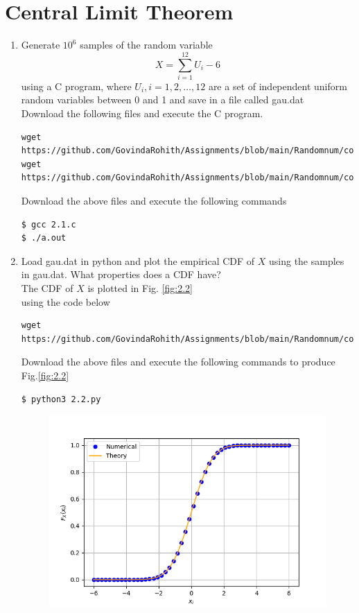\documentclass[journal,12pt,twocolumn]{IEEEtran}
\renewcommand\thesection{\arabic{section}}
\begin{document}
\section{Central Limit Theorem}
%
\begin{enumerate}[label=\thesection.\arabic*
,ref=\thesection.\theenumi]

%
\item
Generate $10^6$ samples of the random variable
%
\begin{equation}
X = \sum_{i=1}^{12}U_i -6
\end{equation}
%
using a C program, where $U_i, i = 1,2,\dots, 12$ are  a set of independent uniform random variables between 0 and 1 and save in a file called gau.dat\\
\solution Download the following files and execute the  C program.
\begin{lstlisting}
wget https://github.com/GovindaRohith/Assignments/blob/main/Randomnum/codes/2.1.c
wget https://github.com/GovindaRohith/Assignments/blob/main/Randomnum/codes/source.h
\end{lstlisting}
Download the above files and execute the following commands
\begin{lstlisting}
$ gcc 2.1.c
$ ./a.out
\end{lstlisting}
\item
Load gau.dat in python and plot the empirical CDF of $X$ using the samples in gau.dat. What properties does a CDF have?\\
\solution The CDF of $X$ is plotted in Fig. \ref{fig:2.2}\\
using the code below
\begin{lstlisting}
wget https://github.com/GovindaRohith/Assignments/blob/main/Randomnum/codes/2.2.py
\end{lstlisting}
Download the above files and execute the following commands to produce Fig.\ref{fig:2.2}
\begin{lstlisting}
$ python3 2.2.py
\end{lstlisting}
\begin{figure}[!h]
\centering
\includegraphics[width=\columnwidth]{./figs/2.2.png}

\end{figure}
\end{enumerate}
\end{document}
